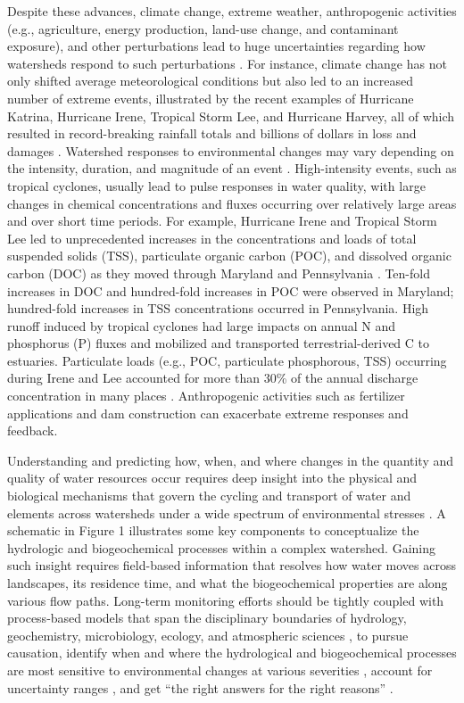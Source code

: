 \documentclass[preprint,review, 12pt]{elsarticle}
\begin{document}
Despite these advances, climate change, extreme weather, anthropogenic activities (e.g., agriculture, energy production, land-use change, and contaminant exposure), and other perturbations lead to huge uncertainties regarding how watersheds respond to such perturbations \citep{Page2012}. For instance, climate change has not only shifted average meteorological conditions but also led to an increased number of extreme events, illustrated by the recent examples of Hurricane Katrina, Hurricane Irene, Tropical Storm Lee, and Hurricane Harvey, all of which resulted in record-breaking rainfall totals and billions of dollars in loss and damages \citep{Vidon2018, Paerl2018b}. Watershed responses to environmental changes may vary depending on the intensity, duration, and magnitude of an event \citep{Kaushal2018g}. High-intensity events, such as tropical cyclones, usually lead to pulse responses in water quality, with large changes in chemical concentrations and fluxes occurring over relatively large areas and over short time periods. For example, Hurricane Irene and Tropical Storm Lee led to unprecedented increases in the concentrations and loads of total suspended solids (TSS), particulate organic carbon (POC), and dissolved organic carbon (DOC) as they moved through Maryland and Pennsylvania \citep{Vidon2018}. Ten-fold increases in DOC and hundred-fold increases in POC were observed in Maryland; hundred-fold increases in TSS concentrations occurred in Pennsylvania. High runoff induced by tropical cyclones had large impacts on annual N and phosphorus (P) fluxes and mobilized and transported terrestrial-derived C to estuaries. Particulate loads (e.g., POC, particulate phosphorous, TSS) occurring during Irene and Lee accounted for more than 30\% of the annual discharge concentration in many places \citep{Paerl2018b}. Anthropogenic activities such as fertilizer applications and dam construction can exacerbate extreme responses and feedback. 


 Understanding and predicting how, when, and where changes in the quantity and quality of water resources occur requires deep insight into the physical and biological mechanisms that govern the cycling and transport of water and elements across watersheds under a wide spectrum of environmental stresses \citep{Laudon2018b}. A schematic in Figure 1 illustrates some key components to conceptualize the hydrologic and biogeochemical processes within a complex watershed. Gaining such insight requires field-based information that resolves how water moves across landscapes, its residence time, and what the biogeochemical properties are along various flow paths. Long-term monitoring efforts should be tightly coupled with process-based models that span the disciplinary boundaries of hydrology, geochemistry, microbiology, ecology, and atmospheric sciences \citep{Bao2017b, Seibert2002}, to pursue causation, identify when and where the hydrological and biogeochemical processes are most sensitive to environmental changes at various severities \citep{Laudon2018b, Murdoch2014}, account for uncertainty ranges \citep{Fatichi2016}, and get “the right answers for the right reasons” \citep{kirchner2006getting}.  
 
\end{document}
